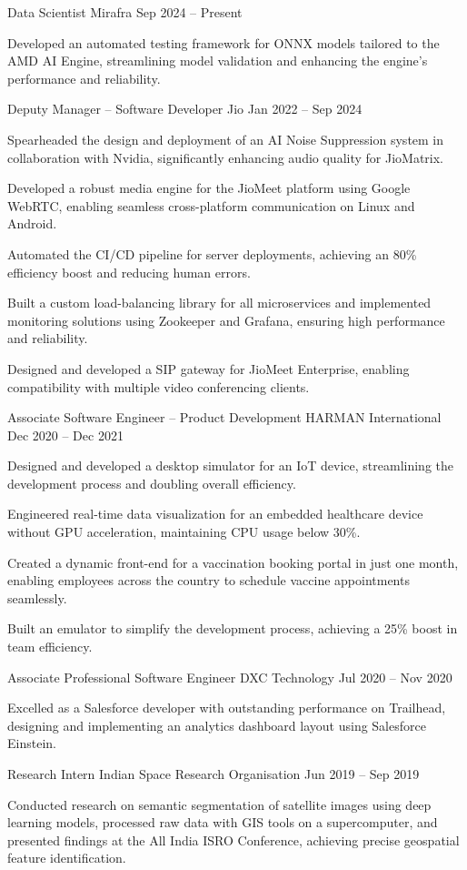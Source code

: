 \experienceSubsection
    {Data Scientist}
    {Mirafra}
    {Sep 2024 -- Present}
    {%
        \item Developed an automated testing framework for ONNX models tailored to the AMD AI Engine, streamlining model validation and enhancing the engine’s performance and reliability.
    }


\experienceSubsection
    {Deputy Manager – Software Developer}
    {Jio}
    {Jan 2022 -- Sep 2024}
    {%
        \item Spearheaded the design and deployment of an AI Noise Suppression system in collaboration with Nvidia, significantly enhancing audio quality for JioMatrix.
        \item Developed a robust media engine for the JioMeet platform using Google WebRTC, enabling seamless cross-platform communication on Linux and Android.
        \item Automated the CI/CD pipeline for server deployments, achieving an 80\% efficiency boost and reducing human errors.
        \item Built a custom load-balancing library for all microservices and implemented monitoring solutions using Zookeeper and Grafana, ensuring high performance and reliability.
        \item Designed and developed a SIP gateway for JioMeet Enterprise, enabling compatibility with multiple video conferencing clients.
    }

\experienceSubsection
    {Associate Software Engineer – Product Development}
    {HARMAN International}
    {Dec 2020 -- Dec 2021}
    {%
        \item Designed and developed a desktop simulator for an IoT device, streamlining the development process and doubling overall efficiency.
        \item Engineered real-time data visualization for an embedded healthcare device without GPU acceleration, maintaining CPU usage below 30\%.
        \item Created a dynamic front-end for a vaccination booking portal in just one month, enabling employees across the country to schedule vaccine appointments seamlessly.
        \item Built an emulator to simplify the development process, achieving a 25\% boost in team efficiency.
    }

\experienceSubsection
    {Associate Professional Software Engineer}
    {DXC Technology}
    {Jul 2020 -- Nov 2020}
    {%
        \item Excelled as a Salesforce developer with outstanding performance on Trailhead, designing and implementing an analytics dashboard layout using Salesforce Einstein.
    }

\experienceSubsection
    {Research Intern}
    {Indian Space Research Organisation}
    {Jun 2019 -- Sep 2019}
    {%
        \item Conducted research on semantic segmentation of satellite images using deep learning models, processed raw data with GIS tools on a supercomputer, and presented findings at the All India ISRO Conference, achieving precise geospatial feature identification.
    }
